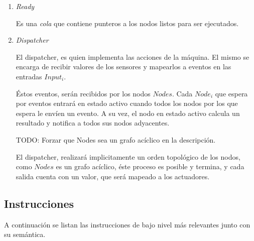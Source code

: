\begin{enumerate}
\item \emph{Ready}

Es una \emph{cola} que contiene punteros a los nodos
listos para ser ejecutados.

\item \emph{Dispatcher}

  El dispatcher, es quien implementa las acciones de la máquina.
  El mismo se encarga de recibir valores de los sensores y mapearlos
a eventos en las entradas $Input_i$.

  Éstos eventos, serán recibidos por los nodos $Nodes$.
  Cada $Node_i$ que espera por eventos entrará en estado activo cuando
todos los nodos por los que espera le envíen un evento.
  A su vez, el nodo en estado activo calcula un resultado y notifica a
todos sus nodos adyacentes.

  TODO: Forzar que Nodes sea un grafo acíclico en la descripción.

  El dispatcher, realizará implicitamente un orden topológico de los
nodos, como $Nodes$ es un grafo acíclico, éste proceso es posible y
termina, y cada salida cuenta con un valor, que será mapeado a los actuadores.

\end{enumerate}

\subsection{Instrucciones}

  A continuación se listan las instrucciones de bajo nivel
  más relevantes junto con su semántica.


